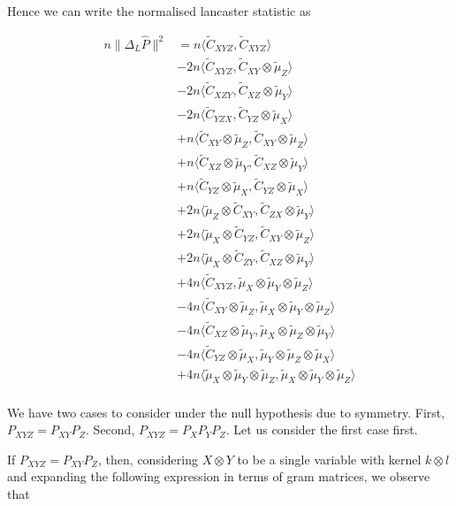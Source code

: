 \documentclass{article}
\begin{document}
Hence we can write the normalised lancaster statistic as

\begin{align*}
n\|\Delta_L \hat{P}\|^2 &= n\langle \tilde{C}_{XYZ},\tilde{C}_{XYZ} \rangle \\& -
2n\langle \tilde{C}_{XYZ},\tilde{C}_{XY}\otimes\tilde{\mu}_Z \rangle \\& -
2n\langle \tilde{C}_{XZY},\tilde{C}_{XZ}\otimes\tilde{\mu}_Y \rangle \\& -
2n\langle \tilde{C}_{YZX},\tilde{C}_{YZ}\otimes\tilde{\mu}_X \rangle \\& +
n\langle \tilde{C}_{XY}\otimes\tilde{\mu}_Z,\tilde{C}_{XY}\otimes\tilde{\mu}_Z \rangle \\& +
n\langle \tilde{C}_{XZ}\otimes\tilde{\mu}_Y,\tilde{C}_{XZ}\otimes\tilde{\mu}_Y \rangle \\& +
n\langle \tilde{C}_{YZ}\otimes\tilde{\mu}_X,\tilde{C}_{YZ}\otimes\tilde{\mu}_X \rangle \\& +
2n\langle \tilde{\mu}_Z\otimes\tilde{C}_{XY},\tilde{C}_{ZX}\otimes\tilde{\mu}_Y \rangle \\& +
2n\langle \tilde{\mu}_X\otimes\tilde{C}_{YZ},\tilde{C}_{XY}\otimes\tilde{\mu}_Z \rangle \\& +
2n\langle \tilde{\mu}_X\otimes\tilde{C}_{ZY},\tilde{C}_{XZ}\otimes\tilde{\mu}_Y \rangle \\& +
4n\langle \tilde{C}_{XYZ},\tilde{\mu}_X \otimes\tilde{\mu}_Y \otimes \tilde{\mu}_Z \rangle \\& -
4n\langle \tilde{C}_{XY}\otimes \tilde{\mu}_Z,\tilde{\mu}_X \otimes\tilde{\mu}_Y \otimes \tilde{\mu}_Z \rangle \\& -
4n\langle \tilde{C}_{XZ}\otimes \tilde{\mu}_Y,\tilde{\mu}_X \otimes\tilde{\mu}_Z \otimes \tilde{\mu}_Y \rangle \\& -
4n\langle \tilde{C}_{YZ}\otimes \tilde{\mu}_X,\tilde{\mu}_Y \otimes\tilde{\mu}_Z \otimes \tilde{\mu}_X \rangle \\& +
4n\langle \tilde{\mu}_X \otimes\tilde{\mu}_Y \otimes \tilde{\mu}_Z,\tilde{\mu}_X \otimes\tilde{\mu}_Y \otimes \tilde{\mu}_Z \rangle \\
\end{align*}

We have two cases to consider under the null hypothesis due to symmetry. First, $P_{XYZ} = P_{XY}P_Z$. Second, $P_{XYZ} = P_XP_YP_Z$. Let us consider the first case first.

If $P_{XYZ} = P_{XY}P_Z$, then, considering $X\otimes Y$ to be a single variable with kernel $k\otimes l$ and expanding the following expression in terms of gram matrices, we observe that
\end{document}
